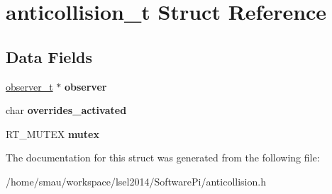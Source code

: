 \hypertarget{structanticollision__t}{\section{anticollision\-\_\-t Struct Reference}
\label{structanticollision__t}
}
\subsection*{Data Fields}
\begin{DoxyCompactItemize}
\item 
\hypertarget{structanticollision__t_a7f73cbc739aeb9482e91bb2237bd1622}{\hyperlink{structobserver__t}{observer\-\_\-t} $\ast$ {\bfseries observer}}\label{structanticollision__t_a7f73cbc739aeb9482e91bb2237bd1622}

\item 
\hypertarget{structanticollision__t_afcf8524c0c9f8bd9adae9f24d165df0c}{char {\bfseries overrides\-\_\-activated}}\label{structanticollision__t_afcf8524c0c9f8bd9adae9f24d165df0c}

\item 
\hypertarget{structanticollision__t_a0f7cb653e4868764b1afbc7975f436fb}{R\-T\-\_\-\-M\-U\-T\-E\-X {\bfseries mutex}}\label{structanticollision__t_a0f7cb653e4868764b1afbc7975f436fb}

\end{DoxyCompactItemize}


The documentation for this struct was generated from the following file\-:\begin{DoxyCompactItemize}
\item 
/home/smau/workspace/lsel2014/\-Software\-Pi/anticollision.\-h\end{DoxyCompactItemize}
